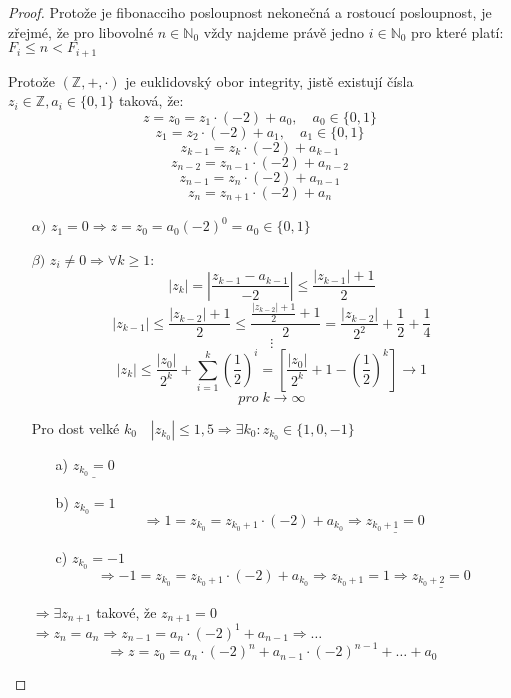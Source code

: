 \documentclass[czech,bachelor,dept470,male]{diploma}
\begin{document}
\begin{proof}\label{fiboDF}
	Protože je fibonacciho posloupnost nekonečná a rostoucí posloupnost, je zřejmé, že pro libovolné $n\in\mathbb{N}_0$ vždy najdeme právě jedno $i\in\mathbb{N}_0$ pro které platí: $F_i\le n<F_{i+1}$
	
	Protože $(\mathbb{Z},+,\cdot)$ je euklidovský obor integrity, jistě existují čísla $z_i\in\mathbb{Z}, a_i\in\{0,1\}$ taková, že:
	$$ z=z_0=z_1\cdot(-2)+a_0,\quad a_0\in\{0,1\}$$
	$$ z_1=z_2\cdot(-2)+a_1,\quad a_1\in\{0,1\}$$
	$$ z_{k-1}=z_k\cdot(-2)+a_{k-1}$$
	$$ z_{n-2}=z_{n-1}\cdot(-2)+a_{n-2}$$
	$$ z_{n-1}=z_n\cdot(-2)+a_{n-1}$$
	$$ z_n=z_{n+1}\cdot(-2)+a_n$$
	\begin{enumerate}
		\item[$\alpha)$] $z_1=0 \Rightarrow z=z_0=a_0(-2)^0=a_0\in\{0,1\}$
		\item[$\beta)$]  $z_i \ne 0 \Rightarrow \forall k \ge 1:$
		$$|z_k|=\left|\frac{z_{k-1}-a_{k-1}}{-2}\right|\le \frac{|z_{k-1}|+1}{2}$$
		$$|z_{k-1}|\le\frac{|z_{k-2}|+1}{2}\le\frac{\frac{|z_{k-2}|+1}{2}+1}{2}=\frac{|z_{k-2}|}{2^2}+\frac{1}{2}+\frac{1}{4}$$
		$$\vdots$$
		$$|z_k|\le\frac{|z_0|}{2^k}+\sum_{i=1}^{k}\left(\frac{1}{2}\right)^i=\left[\frac{|z_0|}{2^k}+1-\left(\frac{1}{2}\right)^k \right]\to 1 $$
		$$ pro\; k \to \infty $$
		
		Pro dost velké $k_0 \quad |z_{k_0}|\le1,5 \Rightarrow \exists k_0:z_{k_0}\in\{1,0,-1\}$
		\begin{enumerate}
			\item[a)] $\underline{z_{k_0}=0}$
			\item[b)]$z_{k_0}=1$
			$$\Rightarrow 1=z_{k_0}=z_{k_0+1}\cdot(-2)+a_{k_0}\Rightarrow \underline{z_{k_0+1}=0}$$
			\item[c)]$z_{k_0}=-1$
			$$\Rightarrow -1=z_{k_0}=z_{k_0+1}\cdot(-2)+a_{k_0}\Rightarrow z_{k_0+1}=1\Rightarrow \underline{z_{k_0+2}=0}$$ 
		\end{enumerate}
		$\Rightarrow \exists z_{n+1}$ takové, že $z_{n+1}=0$\newline
		$\Rightarrow z_n = a_n \Rightarrow z_{n-1}=a_n\cdot(-2)^1+a_{n-1}\Rightarrow \dots$
		$$\Rightarrow z=z_0=a_n\cdot(-2)^n+a_{n-1}\cdot(-2)^{n-1}+\dots+a_0$$
	\end{enumerate}
\end{proof}
\end{document}

